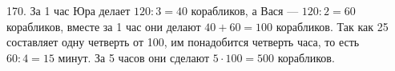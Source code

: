 170. За 1 час Юра делает $120:3=40$ корабликов, а Вася --- $120:2=60$ корабликов, вместе за 1 час они делают $40+60=100$ корабликов. Так как 25 составляет одну четверть от 100, им понадобится четверть часа, то есть $60:4=15$ минут. За 5 часов они сделают $5\cdot100=500$ корабликов.\\
